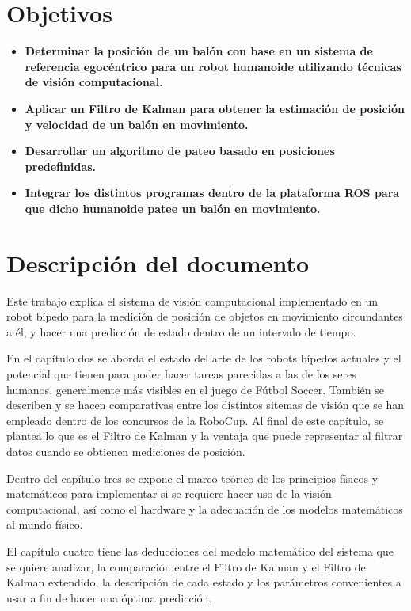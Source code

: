	
\section{Objetivos}
		\begin{itemize}
			\item \textbf{Determinar la posición de un balón con base en un sistema de referencia egocéntrico para un robot humanoide utilizando técnicas de visión computacional.}
			
			\item \textbf{Aplicar un Filtro de Kalman para obtener la estimación de posición y velocidad de un balón en movimiento.}
			
			\item \textbf{Desarrollar un algoritmo de pateo basado en posiciones predefinidas.}
			
			\item \textbf{Integrar los distintos programas dentro de la plataforma ROS para que dicho humanoide patee un balón en movimiento.}
		\end{itemize}

\section{Descripción del documento}
	Este trabajo explica el sistema de visión computacional implementado en un robot bípedo para la medición de posición de objetos en movimiento circundantes a él, y hacer una predicción de estado dentro de un intervalo de tiempo.
	
	En el capítulo dos se aborda el estado del arte de los robots bípedos actuales y el potencial que tienen para poder hacer tareas parecidas a las de los seres humanos, generalmente más visibles en el juego de Fútbol Soccer. También se describen y se hacen comparativas entre los distintos sitemas de visión que se han empleado dentro de los concursos de la RoboCup. Al final de este capítulo, se plantea lo que es el Filtro de Kalman y la ventaja que puede representar al filtrar datos cuando se obtienen mediciones de posición.
	
	Dentro del capítulo tres se expone el marco teórico de los principios físicos y matemáticos para implementar si se requiere hacer uso de la visión computacional, así como el hardware y la adecuación de los modelos matemáticos al mundo físico.
	
	El capítulo cuatro tiene las deducciones del modelo matemático del sistema que se quiere analizar, la comparación entre el Filtro de Kalman y el Filtro de Kalman extendido, la descripción de cada estado y los parámetros convenientes a usar a fin de hacer una óptima predicción.
	
